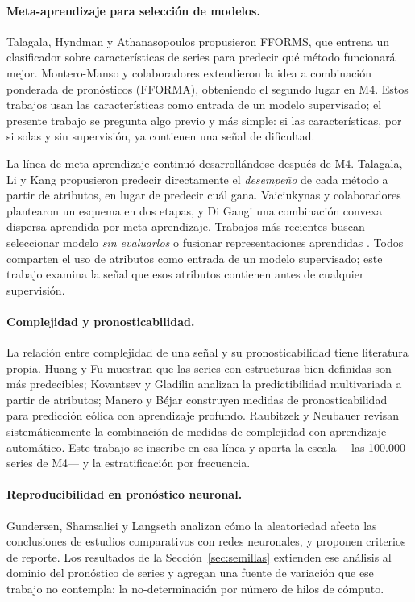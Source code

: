 \paragraph{Meta-aprendizaje para selección de modelos.} Talagala, Hyndman y
Athanasopoulos \cite{talagala2018} propusieron FFORMS, que entrena un clasificador
sobre características de series para predecir qué método funcionará mejor.
Montero-Manso y colaboradores \cite{monteromanso2020} extendieron la idea a
combinación ponderada de pronósticos (FFORMA), obteniendo el segundo lugar en M4.
Estos trabajos usan las características como entrada de un modelo supervisado; el
presente trabajo se pregunta algo previo y más simple: si las características, por
si solas y sin supervisión, ya contienen una señal de dificultad.

La línea de meta-aprendizaje continuó desarrollándose después de M4. Talagala, Li y
Kang \cite{talagala2019} propusieron predecir directamente el \emph{desempeño} de
cada método a partir de atributos, en lugar de predecir cuál gana. Vaiciukynas y
colaboradores \cite{vaiciukynas2021} plantearon un esquema en dos etapas, y Di Gangi
\cite{digangi2022} una combinación convexa dispersa aprendida por meta-aprendizaje.
Trabajos más recientes buscan seleccionar modelo \emph{sin evaluarlos}
\cite{abdallah2025} o fusionar representaciones aprendidas \cite{vanzyl2023}. Todos
comparten el uso de atributos como entrada de un modelo supervisado; este trabajo
examina la señal que esos atributos contienen antes de cualquier supervisión.

\paragraph{Complejidad y pronosticabilidad.} La relación entre complejidad de una
señal y su pronosticabilidad tiene literatura propia. Huang y Fu \cite{huang2019}
muestran que las series con estructuras bien definidas son más predecibles; Kovantsev
y Gladilin \cite{kovantsev2020} analizan la predictibilidad multivariada a partir de
atributos; Manero y Béjar \cite{manero2021} construyen medidas de pronosticabilidad
para predicción eólica con aprendizaje profundo. Raubitzek y Neubauer
\cite{raubitzek2021} revisan sistemáticamente la combinación de medidas de
complejidad con aprendizaje automático. Este trabajo se inscribe en esa línea y
aporta la escala ---las 100.000 series de M4--- y la estratificación por frecuencia.

\paragraph{Reproducibilidad en pronóstico neuronal.} Gundersen, Shamsaliei y Langseth
\cite{gundersen2023} analizan cómo la aleatoriedad afecta las conclusiones de estudios
comparativos con redes neuronales, y proponen criterios de reporte. Los resultados de
la Sección~\ref{sec:semillas} extienden ese análisis al dominio del pronóstico de
series y agregan una fuente de variación que ese trabajo no contempla: la
no-determinación por número de hilos de cómputo.


